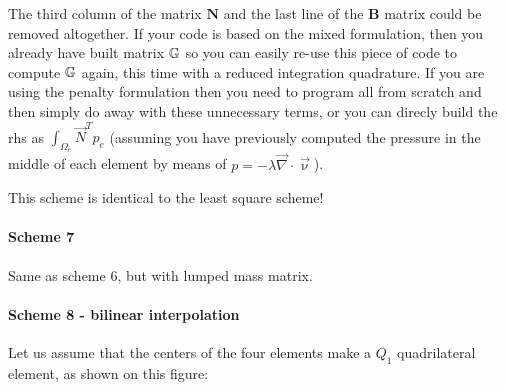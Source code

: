 \begin{remark}
The third column of the matrix ${\bm N}$
and the last line of the ${\bm B}$ matrix could be removed altogether.
If your code is based on the mixed formulation, then you already 
have built matrix ${\mathbb{G}}$ so you can easily re-use this piece of code 
to compute ${\mathbb{G}}$ again, this time with a reduced integration quadrature.
If you are using the penalty formulation then you need to program 
all from scratch and then simply do away with these unnecessary terms, or 
you can direcly build the rhs as $\int_{\Omega_e} \vec{N}^T p_e$ (assuming
you have previously computed the pressure in the middle of each element 
by means of $p=-\lambda\vec\nabla\cdot\vec\upnu$).
\end{remark}

\begin{remark}
This  scheme is identical to the least square scheme!
\end{remark}


\paragraph{Scheme 7}

Same as scheme 6, but with lumped mass matrix.  


\paragraph{Scheme 8 - bilinear interpolation} Let us assume that the centers of the 
four elements make a $Q_1$ quadrilateral element, as shown on this figure:



